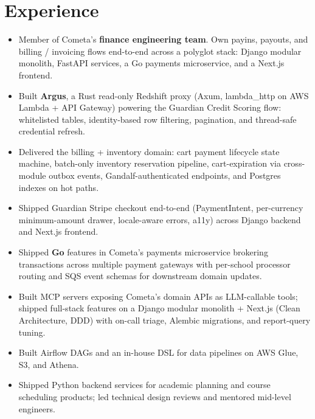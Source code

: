 \section{Experience}

\begin{itemize}
  \item Member of Cometa's \textbf{finance engineering team}. Own payins, payouts, and billing / invoicing flows end-to-end across a polyglot stack: Django modular monolith, FastAPI services, a Go payments microservice, and a Next.js frontend.
  \item Built \textbf{Argus}, a Rust read-only Redshift proxy (Axum, lambda\_http on AWS Lambda + API Gateway) powering the Guardian Credit Scoring flow: whitelisted tables, identity-based row filtering, pagination, and thread-safe credential refresh.
  \item Delivered the billing + inventory domain: cart payment lifecycle state machine, batch-only inventory reservation pipeline, cart-expiration via cross-module outbox events, Gandalf-authenticated endpoints, and Postgres indexes on hot paths.
  \item Shipped Guardian Stripe checkout end-to-end (PaymentIntent, per-currency minimum-amount drawer, locale-aware errors, a11y) across Django backend and Next.js frontend.
  \item Shipped \textbf{Go} features in Cometa's payments microservice brokering transactions across multiple payment gateways with per-school processor routing and SQS event schemas for downstream domain updates.
  \item Built MCP servers exposing Cometa's domain APIs as LLM-callable tools; shipped full-stack features on a Django modular monolith + Next.js (Clean Architecture, DDD) with on-call triage, Alembic migrations, and report-query tuning.
\end{itemize}

\begin{itemize}
  \item Built Airflow DAGs and an in-house DSL for data pipelines on AWS Glue, S3, and Athena.
  \item Shipped Python backend services for academic planning and course
        scheduling products; led technical design reviews and mentored
        mid-level engineers.
\end{itemize}

